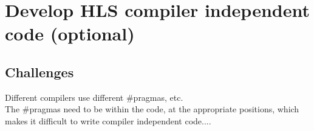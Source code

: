   \section{Develop HLS compiler independent code (optional)}
  \subsection{Challenges}
  Different compilers use different \#pragmas, etc.\\
  The \#pragmas need to be within the code, at the appropriate positions, which makes it difficult to write compiler independent code....
